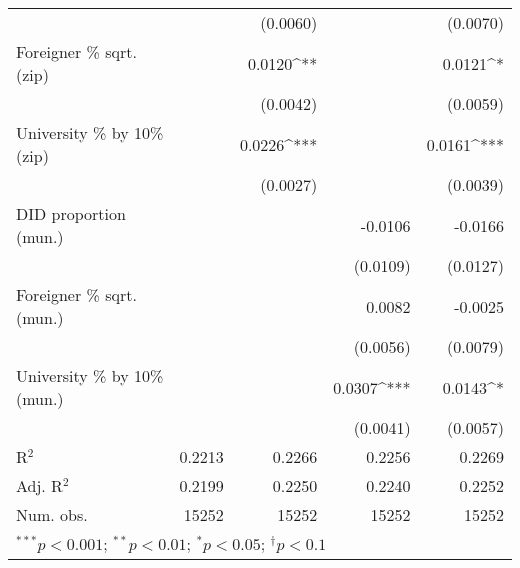 \begin{tabular}{l D{.}{.}{5.7} D{.}{.}{5.7} D{.}{.}{5.7} D{.}{.}{5.7}}
                                  &              & (0.0060)     &              & (0.0070)     \\
Foreigner \% sqrt. (zip)          &              & 0.0120^{**}  &              & 0.0121^{*}   \\
                                  &              & (0.0042)     &              & (0.0059)     \\
University \% by 10\% (zip)       &              & 0.0226^{***} &              & 0.0161^{***} \\
                                  &              & (0.0027)     &              & (0.0039)     \\
DID proportion (mun.)             &              &              & -0.0106      & -0.0166      \\
                                  &              &              & (0.0109)     & (0.0127)     \\
Foreigner \% sqrt. (mun.)         &              &              & 0.0082       & -0.0025      \\
                                  &              &              & (0.0056)     & (0.0079)     \\
University \% by 10\% (mun.)      &              &              & 0.0307^{***} & 0.0143^{*}   \\
                                  &              &              & (0.0041)     & (0.0057)     \\
\midrule
R$^2$                             & 0.2213       & 0.2266       & 0.2256       & 0.2269       \\
Adj. R$^2$                        & 0.2199       & 0.2250       & 0.2240       & 0.2252       \\
Num. obs.                         & 15252        & 15252        & 15252        & 15252        \\
\bottomrule
{}
\end{tabular}
